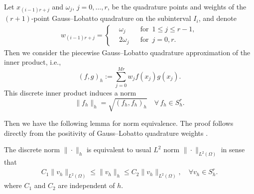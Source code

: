 \documentclass[10pt,final,leqno,onefignum,onetabnum]{siamltex}%
\def\II{(\Omega)}
\begin{document}
Let $x_{(i-1)r+j}$ and { $\omega _{j}$}, $j=0,\dots,r$, be the quadrature
points and weights of the $(r+1)$-point Gauss--Lobatto quadrature on the subinterval $I_i$, and denote
\begin{align*}
w_{(i-1)r+j} =
\left\{
\begin{aligned}
&\omega_j &&\mbox{for}\,\,\, 1\le j\le r-1,\\
&2\omega_j &&\mbox{for}\,\,\, j=0, r.
\end{aligned}
\right.
\end{align*}
Then  we consider the piecewise Gauss--Lobatto quadrature approximation of the inner product, i.e.,
$$
(f,g)_h
:=  \sum_{j=0}^{Mr} w_j f(x_j) g(x_j)  .
$$
This discrete inner product induces a norm
$$
\|f_h\|_h=\sqrt{(f_h,f_h)_h} \quad\forall\, f_h\in S_h^r.
$$

Then we have the following lemma for norm equivalence. The proof follows directly from the positivity of
{Gauss--Lobatto} quadrature weights \cite[p. 426]{Quarteroni:2000}.


\begin{lemma}\label{lem:norm-equivalence}
The discrete norm $\| \cdot \|_h$ is equivalent to usual $L^2$ norm $\| \cdot \|_{L^2\II}$ in sense that
\begin{align*}%
 C_1 \|v_h\|_{L^2(\Omega)} \le \|v_h\|_h \le  C_2 \|v_h\|_{L^2(\Omega)} ,\quad \forall v_h\in S_h^r.
\end{align*}
where $C_1$ and $C_2$ are independent of $h$.
\end{lemma}
\end{document}
